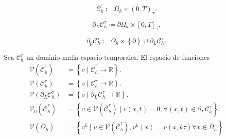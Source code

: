 \begin{definition}
	\begin{equation*}
		\overline{\mathcal{C}}^{\tau}_{h}\coloneqq
		\Omega_{h}\times
		{\left(0,T\right)}_{\tau}.
	\end{equation*}
\end{definition}

\begin{definition}
	\begin{equation*}
		\partial_{L}
		\mathcal{C}^{\tau}_{h}\coloneqq
		\partial\Omega_{h}\times
		{\left[0,T\right]}_{\tau}.
	\end{equation*}
\end{definition}

\begin{definition}
	\begin{equation*}
		\partial_{p}
		\mathcal{C}^{\tau}_{h}\coloneqq
		\overline{\Omega}_{h}\times
		\left\{0\right\}\cup
		\partial_{L}
		\mathcal{C}^{\tau}_{h}.
	\end{equation*}
\end{definition}

\begin{definition}
	Sea $\mathcal{C}^{\tau}_{h}$ un dominio malla espacio-temporales.
	El espacio de funciones
	\begin{align*}
		\mathcal{V}
		\left(
		\overline{\mathcal{C}}^{\tau}_{h}
		\right) & =
		\left\{
		v\mid
		\overline{\mathcal{C}}^{\tau}_{h}\to\mathbb{R}
		\right\}.   \\
		\mathcal{V}
		\left(
		\mathcal{C}^{\tau}_{h}
		\right) & =
		\left\{
		v\mid
		\mathcal{C}^{\tau}_{h}\to\mathbb{R}
		\right\}.   \\
		\mathcal{V}
		\left(
		\partial_{L}\mathcal{C}^{\tau}_{h}
		\right) & =
		\left\{
		v\mid
		\partial_{L}\mathcal{C}^{\tau}_{h}\to\mathbb{R}
		\right\}.   \\
		\mathcal{V}_{0}
		\left(
		\overline{\mathcal{C}}^{\tau}_{h}
		\right) & =
		\left\{
		v\in
		\mathcal{V}\left(\overline{\mathcal{C}}^{\tau}_{h}\right)\mid
		v\left(x,t\right)=0,
		\forall\left(x,t\right)\in\partial_{L}\mathcal{C}^{\tau}_{h}
		\right\}.   \\
		\mathcal{V}
		\left(
		\overline{\Omega}_{h}
		\right) & =
		\left\{
		v^{k}\mid
		v\in
		\mathcal{V}
		\left(
		\overline{\mathcal{C}}^{\tau}_{h}
		\right),
		v^{k}\left(x\right)=
		v\left(x,k\tau\right)
		\forall x\in\overline{\Omega}_{h}
		\right\}
	\end{align*}
\end{definition}

